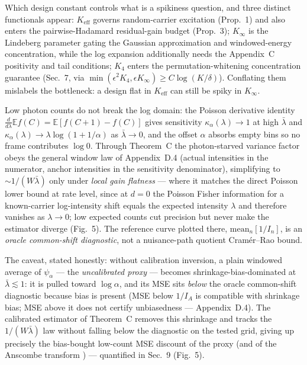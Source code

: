 Which design constant controls what is a spikiness question, and three distinct functionals appear: $K_{\mathrm{eff}}$ governs random-carrier excitation (Prop.~1) and also enters the pairwise-Hadamard residual-gain budget (Prop.~3); $K_\infty$ is the Lindeberg parameter gating the Gaussian approximation and windowed-energy concentration, while the log expansion additionally needs the Appendix~C positivity and tail conditions; $K_4$ enters the permutation-whitening concentration guarantee (Sec.~7, via $\min(\epsilon^2 K_4,\epsilon K_\infty)\ge C\log(K/\delta)$). Conflating them mislabels the bottleneck: a design flat in $K_{\mathrm{eff}}$ can still be spiky in $K_\infty$.

Low photon counts do not break the log domain: the Poisson derivative identity $\frac{d}{d\lambda}\mathbb{E}f(C)=\mathbb{E}[f(C{+}1){-}f(C)]$ gives sensitivity $\kappa_\alpha(\lambda)\to 1$ at high $\bar\lambda$ and $\kappa_\alpha(\lambda)\to\lambda\log(1+1/\alpha)$ as $\bar\lambda\to 0$, and the offset $\alpha$ absorbs empty bins so no frame contributes $\log 0$. Through Theorem~C the photon-starved variance factor obeys the general window law of Appendix~D.4 (actual intensities in the numerator, anchor intensities in the sensitivity denominator), simplifying to $\sim1/(W\bar\lambda)$ only under \emph{local gain flatness} --- where it matches the direct Poisson lower bound at rate level, since at $d=0$ the Poisson Fisher information for a known-carrier log-intensity shift equals the expected intensity $\lambda$ and therefore vanishes as $\lambda\to0$; low expected counts cut precision but never make the estimator diverge (Fig.~5). The reference curve plotted there, $\mathrm{mean}_n[1/I_n]$, is an \emph{oracle common-shift diagnostic}, not a nuisance-path quotient Cram\'er--Rao bound.

The caveat, stated honestly: without calibration inversion, a plain windowed average of $\psi_\alpha$ --- the \emph{uncalibrated proxy} --- becomes shrinkage-bias-dominated at $\bar\lambda\lesssim1$: it is pulled toward $\log\alpha$, and its MSE sits \emph{below} the oracle common-shift diagnostic because bias is present (MSE below $1/I_A$ is compatible with shrinkage bias; MSE above it does not certify unbiasedness --- Appendix~D.4). The calibrated estimator of Theorem~C removes this shrinkage and tracks the $1/(W\bar\lambda)$ law without falling below the diagnostic on the tested grid, giving up precisely the bias-bought low-count MSE discount of the proxy (and of the Anscombe transform \cite{Anscombe1948}) --- quantified in Sec.~9 (Fig.~5).

